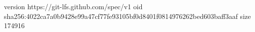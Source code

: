 version https://git-lfs.github.com/spec/v1
oid sha256:4022ca7a0b9428e99a47cf77fe93105bf0d8401f0814976262bed603baff3aaf
size 174916
